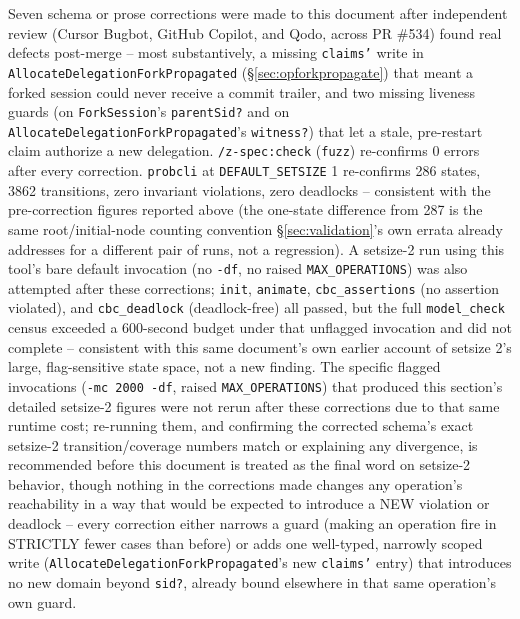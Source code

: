 \documentclass[a4paper,10pt,fleqn]{article}
\newcommand{\field}[1]{\texttt{#1}}
\begin{document}
Seven schema or prose corrections were made to this document after
independent review (Cursor Bugbot, GitHub Copilot, and Qodo, across
PR \#534) found real defects post-merge -- most substantively, a
missing \field{claims'} write in
\field{AllocateDelegationForkPropagated} (\S\ref{sec:opforkpropagate})
that meant a forked session could never receive a commit trailer, and
two missing liveness guards (on \field{ForkSession}'s
\field{parentSid?} and on \field{AllocateDelegationForkPropagated}'s
\field{witness?}) that let a stale, pre-restart claim authorize a new
delegation. \texttt{/z-spec:check} (\texttt{fuzz}) re-confirms 0 errors
after every correction. \texttt{probcli} at \field{DEFAULT\_SETSIZE} 1
re-confirms 286 states, 3862 transitions, zero invariant violations,
zero deadlocks -- consistent with the pre-correction figures reported
above (the one-state difference from 287 is the same root/initial-node
counting convention \S\ref{sec:validation}'s own errata already
addresses for a different pair of runs, not a regression). A
setsize-2 run using this tool's bare default invocation (no
\texttt{-df}, no raised \field{MAX\_OPERATIONS}) was also attempted
after these corrections; \texttt{init}, \texttt{animate},
\texttt{cbc\_assertions} (no assertion violated), and
\texttt{cbc\_deadlock} (deadlock-free) all passed, but the full
\texttt{model\_check} census exceeded a 600-second budget under that
unflagged invocation and did not complete -- consistent with this same
document's own earlier account of setsize 2's large, flag-sensitive
state space, not a new finding. The specific flagged invocations
(\texttt{-mc 2000 -df}, raised \field{MAX\_OPERATIONS}) that produced
this section's detailed setsize-2 figures were not rerun after these
corrections due to that same runtime cost; re-running them, and
confirming the corrected schema's exact setsize-2 transition/coverage
numbers match or explaining any divergence, is recommended before this
document is treated as the final word on setsize-2 behavior, though
nothing in the corrections made changes any operation's reachability in
a way that would be expected to introduce a NEW violation or deadlock
-- every correction either narrows a guard (making an operation fire in
STRICTLY fewer cases than before) or adds one well-typed, narrowly
scoped write (\field{AllocateDelegationForkPropagated}'s new
\field{claims'} entry) that introduces no new domain beyond
\field{sid?}, already bound elsewhere in that same operation's own
guard.
\end{document}
